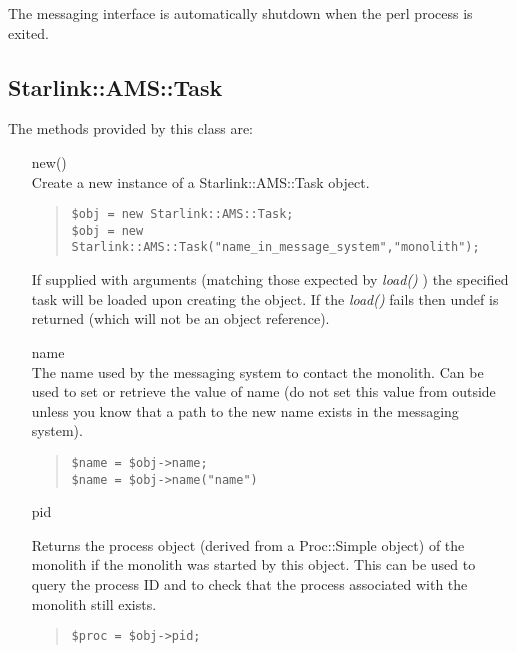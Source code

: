 \documentclass[twoside,11pt]{article}
\newenvironment{myquote}{\begin{quote}\begin{small}}{\end{small}\end{quote}}
\renewcommand{\_}{\texttt{\symbol{95}}}
\begin{document}
The messaging interface is automatically shutdown when the perl process is
exited. 

\subsection{Starlink::AMS::Task}

The methods provided by this class are:

\begin{itemize}

\item[new()]%
%
\hfil\\
Create a new instance of a Starlink::AMS::Task object.
\begin{myquote}
\begin{verbatim}
$obj = new Starlink::AMS::Task;
$obj = new Starlink::AMS::Task("name_in_message_system","monolith");
\end{verbatim}
\end{myquote}

If supplied with arguments (matching those expected by {\em load()\/} ) the
specified task will be loaded upon creating the object. If the {\em load()\/}
fails then undef is returned (which will not be an object reference).

\item[name]%
%
\hfil\\
The name used by the messaging system to contact the monolith.
Can be used to set or retrieve the value of name (do not set
this value from outside unless you know that a path to the 
new name exists in the messaging system).
\begin{myquote}
\begin{verbatim}
$name = $obj->name;
$name = $obj->name("name")
\end{verbatim}
\end{myquote}

\item[pid]%
%

Returns the process object (derived from a Proc::Simple object)
of the monolith if the monolith was started by this object.
This can be used to query the process ID and to check that
the process associated with the monolith still exists.
\begin{myquote}
\begin{verbatim}
$proc = $obj->pid;
\end{verbatim}
\end{myquote}


\end{itemize}
\end{document}
